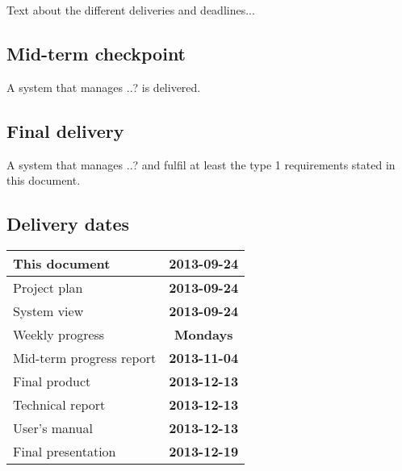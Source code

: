 Text about the different deliveries and deadlines...

\subsection{Mid-term checkpoint}
A system that manages ..? is delivered.

\subsection{Final delivery}
A system that manages ..? and fulfil at least the type 1 requirements stated in this document.

\subsection{Delivery dates}
\label{sec:delivery_req}
\begin{center}
	\begin{Large}
	\begin{tabular}{|p{12.5cm}|c|}
		\hline
		\large{This document} & \large{\textbf{2013-09-24}} \\
		\hline
		\large{Project plan} & \large{\textbf{2013-09-24}} \\
		\hline
		\large{System view} & \large{\textbf{2013-09-24}} \\
		\hline
		\large{Weekly progress} & \large{\textbf{Mondays}} \\
		\hline
		\large{Mid-term progress report} & \large{\textbf{2013-11-04}} \\
		\hline
		\large{Final product} & \large{\textbf{2013-12-13}} \\
		\hline
		\large{Technical report} & \large{\textbf{2013-12-13}} \\
		\hline
		\large{User's manual} & \large{\textbf{2013-12-13}} \\
		\hline
		\large{Final presentation} & \large{\textbf{2013-12-19}} \\
		\hline	
		
	\end{tabular}
	\end{Large}
\end{center}
